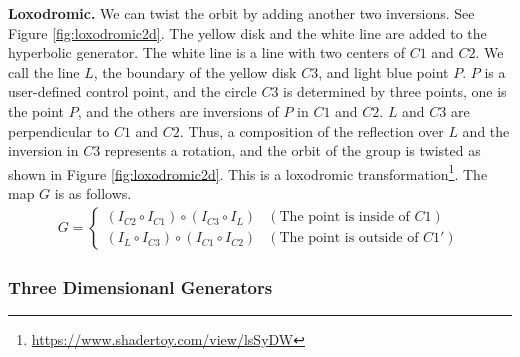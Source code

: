 \noindent\textbf{Loxodromic.}
 We can twist the orbit by adding another two inversions.
 See Figure \ref{fig:loxodromic2d}.
 The yellow disk and the white line are added to the hyperbolic generator.
 The white line is a line with two centers of $C1$ and $C2$.
 We call the line $L$, the boundary of the yellow disk $C3$, and
 light blue point $P$.
 $P$ is a user-defined control point, and the circle $C3$ is determined
 by three points, one is the point $P$, and the others are inversions
 of $P$ in $C1$ and $C2$.
 $L$ and $C3$ are perpendicular to $C1$ and $C2$.
 Thus, a composition of the reflection over $L$ and the inversion in $C3$
 represents a rotation, and
 the orbit of the group is twisted as shown in Figure
 \ref{fig:loxodromic2d}. This is a loxodromic
 transformation\footnote{\url{https://www.shadertoy.com/view/lsSyDW}}.
 The map $G$ is as follows.
 \begin{align*}
  G =
  \begin{cases}
   (I_{C2} \circ I_{C1}) \circ (I_{C3} \circ I_L) & (\text{The point is inside of } C1) \\
   (I_L \circ I_{C3}) \circ (I_{C1} \circ I_{C2}) & (\text{The point is outside of }C1')
  \end{cases}
 \end{align*}

\subsubsection{Three Dimensionanl Generators}

